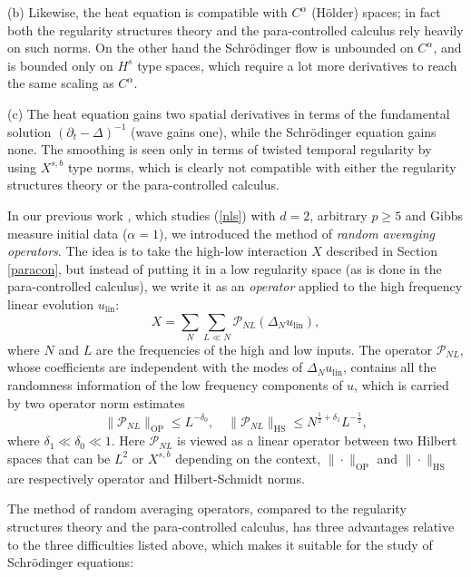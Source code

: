 \documentclass[11 pt,reqno]{amsart}
\theoremstyle{definition}
\theoremstyle{remark}
\numberwithin{equation}{section}
\newcommand{\Pc}{\mathcal{P}}
\begin{document}
(b) Likewise, the heat equation is compatible with $C^\alpha$ (H\"{o}lder) spaces; in fact both the regularity structures theory and the para-controlled calculus rely heavily on such norms. On the other hand the Schr\"{o}dinger flow is unbounded on $C^\alpha$, and is bounded only on $H^s$ type spaces, which require a lot more derivatives to reach the same scaling as $C^\alpha$.

(c) The heat equation gains two spatial derivatives in terms of the fundamental solution $(\partial_t-\Delta)^{-1}$ (wave gains one), while the Schr\"{o}dinger equation gains none. The smoothing is seen only in terms of twisted temporal regularity by using $X^{s,b}$ type norms, which is clearly not compatible with either the regularity structures theory or the para-controlled calculus.

In our previous work \cite{DNY}, which studies (\ref{nls}) with $d=2$, arbitrary $p\geq 5$ and Gibbs measure initial data ($\alpha=1$), we introduced the method of \emph{random averaging operators}. The idea is to take the high-low interaction $X$ described in Section \ref{paracon}, but instead of putting it in a low regularity space (as is done in the para-controlled calculus), we write it as an \emph{operator} applied to the high frequency linear evolution $u_\mathrm{lin}$:
\begin{equation}\label{rao}X=\sum_N\sum_{L\ll N}\Pc_{NL}(\Delta_Nu_\mathrm{lin}),\end{equation} where $N$ and $L$ are the frequencies of the high and low inputs. The operator $\Pc_{NL}$, whose coefficients are independent with the modes of $\Delta_Nu_\mathrm{lin}$, contains all the randomness information of the low frequency components of $u$, which is carried by two operator norm estimates
\begin{equation}\label{rao1}\|\Pc_{NL}\|_{\mathrm{OP}}\leq L^{-\delta_0},\quad \|\Pc_{NL}\|_{\mathrm{HS}}\leq N^{\frac{1}{2}+\delta_1}L^{-\frac{1}{2}},\end{equation} where $\delta_1\ll\delta_0\ll 1$. Here $\Pc_{NL}$ is viewed as a linear operator between two Hilbert spaces that can be $L^2$ or $X^{s,b}$ depending on the context, $\|\cdot\|_{\mathrm{OP}}$ and $\|\cdot\|_{\mathrm{HS}}$ are respectively operator and Hilbert-Schmidt norms.

The method of random averaging operators, compared to the regularity structures theory and the para-controlled calculus, has three advantages relative to the three difficulties listed above, which makes it suitable for the study of Schr\"{o}dinger equations:
\end{document}

